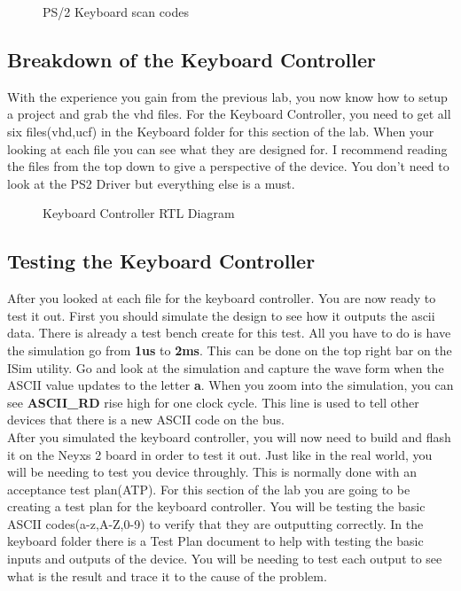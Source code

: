 \documentclass{article}
\begin{document}
\begin{figure}[!htbp]
  \centering
  \caption{PS/2 Keyboard scan codes}
\end{figure}

\newpage
\subsection{Breakdown of the Keyboard Controller}
With the experience you gain from the previous lab, you now know how to setup a project and grab the vhd files. For the Keyboard Controller, you need to get all six files(vhd,ucf) in the Keyboard folder for this section of the lab. When your looking at each file you can see what they are designed for. I recommend reading the files from the top down to give a perspective of the device. You don't need to look at the PS2 Driver but everything else is a must.

\begin{figure}[!htbp]
  \centering
  \caption{Keyboard Controller RTL Diagram}
\end{figure}

\subsection{Testing the Keyboard Controller}
After you looked at each file for the keyboard controller. You are now ready to test it out. First you should simulate the design to see how it outputs the ascii data. There is already a test bench create for this test. All you have to do is have the simulation go from \textbf{1us} to \textbf{2ms}. This can be done on the top right bar on the ISim utility. Go and look at the simulation and capture the wave form when the ASCII value updates to the letter \textbf{a}. When you zoom into the simulation, you can see \textbf{ASCII\_RD} rise high for one clock cycle. This line is used to tell other devices that there is a new ASCII code on the bus. \\

After you simulated the keyboard controller, you will now need to build and flash it on the Neyxs 2 board in order to test it out. Just like in the real world, you will be needing to test you device throughly. This is normally done with an acceptance test plan(ATP). For this section of the lab you are going to be creating a test plan for the keyboard controller. You will be testing the basic ASCII codes(a-z,A-Z,0-9) to verify that they are outputting correctly. In the keyboard folder there is a Test Plan document to help with testing the basic inputs and outputs of the device. You will be needing to test each output to see what is the result and trace it to the cause of the problem.
\end{document}
